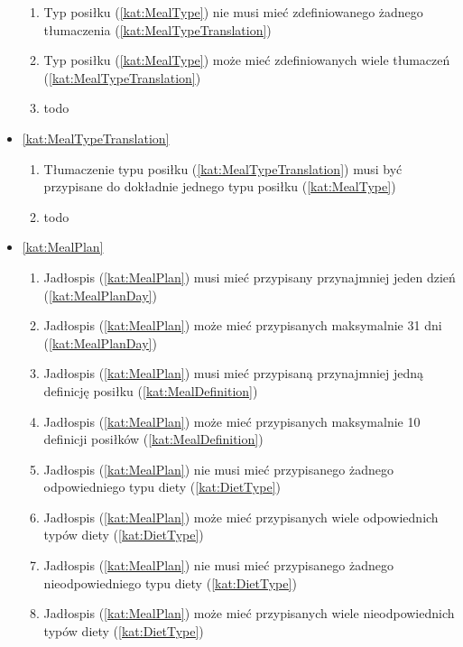 \begin{itemize}[label={\textbf{Reguły dla}}, wide, labelwidth=!, labelindent=0pt]
\begin{enumerate}[label={\textbf{REG/\protect\threedigits{\arabic{enumi}}}}, wide, labelwidth=!, align=left, leftmargin=3cm, resume]
        \item Typ posiłku (\ref{kat:MealType}) nie musi mieć zdefiniowanego żadnego tłumaczenia (\ref{kat:MealTypeTranslation})
        \item Typ posiłku (\ref{kat:MealType}) może mieć zdefiniowanych wiele tłumaczeń (\ref{kat:MealTypeTranslation})
        \item todo
    \end{enumerate}
    \item\ref{kat:MealTypeTranslation}
    \begin{enumerate}[label={\textbf{REG/\protect\threedigits{\arabic{enumi}}}}, wide, labelwidth=!, align=left, leftmargin=3cm, resume]
        \item Tłumaczenie typu posiłku (\ref{kat:MealTypeTranslation}) musi być przypisane do dokładnie jednego typu posiłku (\ref{kat:MealType})
        \item todo
    \end{enumerate}
    \item\ref{kat:MealPlan}
    \begin{enumerate}[label={\textbf{REG/\protect\threedigits{\arabic{enumi}}}}, wide, labelwidth=!, align=left, leftmargin=3cm, resume]
        \item Jadłospis (\ref{kat:MealPlan}) musi mieć przypisany przynajmniej jeden dzień (\ref{kat:MealPlanDay})
        \item Jadłospis (\ref{kat:MealPlan}) może mieć przypisanych maksymalnie 31 dni (\ref{kat:MealPlanDay})
        \item Jadłospis (\ref{kat:MealPlan}) musi mieć przypisaną przynajmniej jedną definicję posiłku (\ref{kat:MealDefinition})
        \item Jadłospis (\ref{kat:MealPlan}) może mieć przypisanych maksymalnie 10 definicji posiłków (\ref{kat:MealDefinition})
        \item Jadłospis (\ref{kat:MealPlan}) nie musi mieć przypisanego żadnego odpowiedniego typu diety (\ref{kat:DietType})
        \item Jadłospis (\ref{kat:MealPlan}) może mieć przypisanych wiele odpowiednich typów diety (\ref{kat:DietType})
        \item Jadłospis (\ref{kat:MealPlan}) nie musi mieć przypisanego żadnego nieodpowiedniego typu diety (\ref{kat:DietType})
        \item Jadłospis (\ref{kat:MealPlan}) może mieć przypisanych wiele nieodpowiednich typów diety (\ref{kat:DietType})

\end{enumerate}
\end{itemize}
